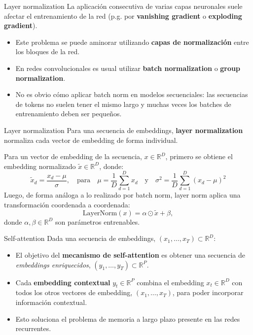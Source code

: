 \documentclass{beamer}
\newcommand{\R}{\mathbb{R}}
\begin{document}
\begin{frame}{Layer normalization}
    La aplicación consecutiva de varias capas neuronales suele afectar el entrenamiento de la red (p.g. por \textbf{vanishing gradient} o \textbf{exploding gradient}).
    \begin{itemize}
        \item Este problema se puede aminorar utilizando \textbf{capas de normalización} entre los bloques de la red.
        \item En redes convolucionales es usual utilizar \textbf{batch normalization} o \textbf{group normalization}.
        \item No es obvio cómo aplicar batch norm en modelos secuenciales: las secuencias de tokens no suelen tener el mismo largo y muchas veces los batches de entrenamiento deben ser pequeños.
    \end{itemize}
\end{frame}

\begin{frame}{Layer normalization}
    Para una secuencia de embeddings, \textbf{layer normalization} normaliza cada vector de embedding de forma individual.

    Para un vector de embedding de la secuencia, $x\in\R^{D}$, primero se obtiene el embedding normalizado $\tilde x\in\R^D$, donde:
    \begin{equation*}
        \tilde x_d = \frac{x_d - \mu}{\sigma},
        \quad\text{para}\quad
        \mu = \frac{1}{D} \sum_{d=1}^{D} x_d
        \quad\text{y}\quad
        \sigma^2 = \frac{1}{D} \sum_{d=1}^{D} (x_d - \mu)^2
    \end{equation*}
    Luego, de forma análoga a lo realizado por batch norm, layer norm aplica una transformación coordenada a coordenada:
    \begin{equation*}
        \text{LayerNorm}(x) = \alpha \odot \tilde x + \beta,
    \end{equation*}
    donde $\alpha,\beta\in\R^D$ son parámetros entrenables.
\end{frame}

\begin{frame}{Self-attention}
    Dada una secuencia de embeddings, $(x_1,\ldots,x_T)\subset\R^D$:
    \begin{itemize}
        \item El objetivo del \textbf{mecanismo de self-attention} es obtener una secuencia de \textit{embeddings enriquecidos}, $(y_1,\ldots,y_T)\subset\R^P$.
        \item Cada \textbf{embedding contextual} $y_t\in\R^P$ combina el embedding $x_t\in\R^D$ con todos los otros vectores de embedding, $(x_1,\ldots,x_T)$, para poder incorporar información contextual.
        \item Esto soluciona el problema de memoria a largo plazo presente en las redes recurrentes.
    \end{itemize}
\end{frame}
\end{document}
